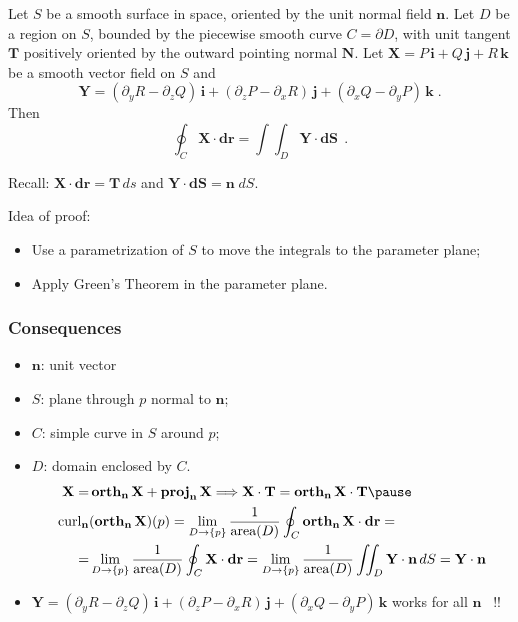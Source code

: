 \begin{frame}

\begin{theorem}[Stokes]{\rm
Let $S$ be a smooth surface in space, oriented by the unit normal field $\textbf{n}$. Let $D$ be a region on $S$, bounded by the piecewise smooth curve $C=\partial D$, with unit tangent $\textbf{T}$ positively oriented by the outward pointing normal $\textbf{N}$. Let
$\textbf{X}=P \, \textbf{i} + Q\, \textbf{j} + R\, \textbf{k}$ be a smooth vector field on $S$ and
%
$$  \textbf{Y} = (\partial_y R - \partial_z Q) \, \textbf{i} +  (\partial_z P - \partial_x R) \, \textbf{j} + (\partial_x Q - \partial_y P) \, \textbf{k} \; .
$$
%
Then
%
$$\oint_C \textbf{X} \cdot \textbf{dr} = \int\!\!\! \int_D \textbf{Y} \cdot \textbf{dS}\, \; .$$}
\end{theorem}

Recall: $\textbf{X}\cdot \textbf{dr} = \textbf{T}\, ds$ and $\textbf{Y} \cdot \textbf{dS} = \textbf{n} \; dS$.

\pause Idea of proof:
\begin{itemize}
  \item \pause Use a parametrization of $S$ to move the integrals to the parameter plane;
  \item \pause Apply Green's Theorem in the parameter plane.
\end{itemize}

\end{frame}

\begin{frame}
  \frametitle{Consequences}

  \begin{itemize}
    \item $\textbf{n}$: unit vector
    \item $S$: plane through $p$ normal to $\textbf{n}$;
    \item $C$: simple curve in $S$ around $p$;
    \item $D$: domain enclosed by $C$.\pause
    \begin{align*}
    \textbf{X} = & \orth_{\textbf{n}} \textbf{X} + \proj_{\textbf{n}} \textbf{X} \Longrightarrow \textbf{X}\cdot \textbf{T} = \orth_{\textbf{n}} \textbf{X} \cdot \textbf{T} \pause \\
      \text{curl}_{\textbf{n}} &(\orth_{\textbf{n}} \textbf{X}) (p) = \lim_{D\to\{p\}} \frac{1}{\text{area}(D)} \oint_C \orth_{\textbf{n}} \textbf{X} \cdot \textbf{dr} = \\
      = & \lim_{D\to\{p\}} \frac{1}{\text{area}(D)} \oint_C
      \textbf{X}\cdot \textbf{dr} = \lim_{D\to\{p\}} \frac{1}{\text{area}(D)} \int\!\!\!\int_D \textbf{Y}\cdot \textbf{n} \, dS = \textbf{Y}\cdot \textbf{n}
    \end{align*}
    \item \pause $\textbf{Y} = (\partial_y R - \partial_z Q) \, \textbf{i} +  (\partial_z P - \partial_x R) \, \textbf{j} + (\partial_x Q - \partial_y P) \, \textbf{k}$ works for all $\textbf{n}$ \, !!
  \end{itemize}
\end{frame}

